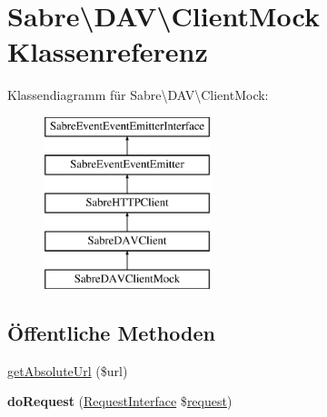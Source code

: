 \hypertarget{class_sabre_1_1_d_a_v_1_1_client_mock}{}\section{Sabre\textbackslash{}D\+AV\textbackslash{}Client\+Mock Klassenreferenz}
\label{class_sabre_1_1_d_a_v_1_1_client_mock}
Klassendiagramm für Sabre\textbackslash{}D\+AV\textbackslash{}Client\+Mock\+:\begin{figure}[H]
\begin{center}
\leavevmode
\includegraphics[height=5.000000cm]{class_sabre_1_1_d_a_v_1_1_client_mock}
\end{center}
\end{figure}
\subsection*{Öffentliche Methoden}
\begin{DoxyCompactItemize}
\item 
\mbox{\hyperlink{class_sabre_1_1_d_a_v_1_1_client_mock_ae1ef8932853a9505c1b73df3168cf3d3}{get\+Absolute\+Url}} (\$url)
\item 
\mbox{\label{class_sabre_1_1_d_a_v_1_1_client_mock_a5949872a63a9299faea47cddb6f32286}} 
{\bfseries do\+Request} (\mbox{\hyperlink{interface_sabre_1_1_h_t_t_p_1_1_request_interface}{Request\+Interface}} \$\mbox{\hyperlink{class_sabre_1_1_d_a_v_1_1_client_a6255d861b39ab83e7807d3c3f5503829}{request}})
\end{DoxyCompactItemize}
